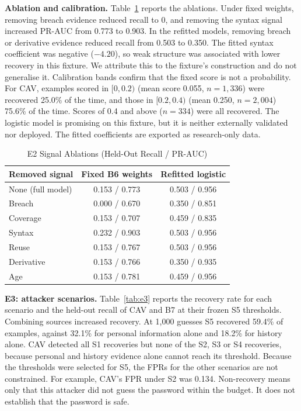 \documentclass[conference]{IEEEtran}
\begin{document}
\textbf{Ablation and calibration.} Table~\ref{tab:abl} reports the ablations. Under fixed weights, removing breach evidence reduced recall to 0, and removing the syntax signal increased PR-AUC from 0.773 to 0.903. In the refitted models, removing breach or derivative evidence reduced recall from 0.503 to 0.350. The fitted syntax coefficient was negative ($-4.20$), so weak structure was associated with lower recovery in this fixture. We attribute this to the fixture's construction and do not generalise it. Calibration bands confirm that the fixed score is not a probability. For CAV, examples scored in $[0,0.2)$ (mean score 0.055, $n=1{,}336$) were recovered 25.0\% of the time, and those in $[0.2,0.4)$ (mean 0.250, $n=2{,}004$) 75.6\% of the time. Scores of 0.4 and above ($n=334$) were all recovered. The logistic model is promising on this fixture, but it is neither externally validated nor deployed. The fitted coefficients are exported as research-only data.

\begin{table}[t]
\caption{E2 Signal Ablations (Held-Out Recall / PR-AUC)}
\label{tab:abl}
\centering\footnotesize
\begin{tabular}{@{}lcc@{}}
\toprule
Removed signal & Fixed B6 weights & Refitted logistic\\
\midrule
None (full model) & 0.153 / 0.773 & 0.503 / 0.956\\
Breach & 0.000 / 0.670 & 0.350 / 0.851\\
Coverage & 0.153 / 0.707 & 0.459 / 0.835\\
Syntax & 0.232 / 0.903 & 0.503 / 0.956\\
Reuse & 0.153 / 0.767 & 0.503 / 0.956\\
Derivative & 0.153 / 0.766 & 0.350 / 0.935\\
Age & 0.153 / 0.781 & 0.459 / 0.956\\
\bottomrule
\end{tabular}
\end{table}

\textbf{E3: attacker scenarios.} Table~\ref{tab:e3} reports the recovery rate for each scenario and the held-out recall of CAV and B7 at their frozen S5 thresholds. Combining sources increased recovery. At 1,000 guesses S5 recovered 59.4\% of examples, against 32.1\% for personal information alone and 18.2\% for history alone. CAV detected all S1 recoveries but none of the S2, S3 or S4 recoveries, because personal and history evidence alone cannot reach its threshold. Because the thresholds were selected for S5, the FPRs for the other scenarios are not constrained. For example, CAV's FPR under S2 was 0.134. Non-recovery means only that this attacker did not guess the password within the budget. It does not establish that the password is safe.
\end{document}
